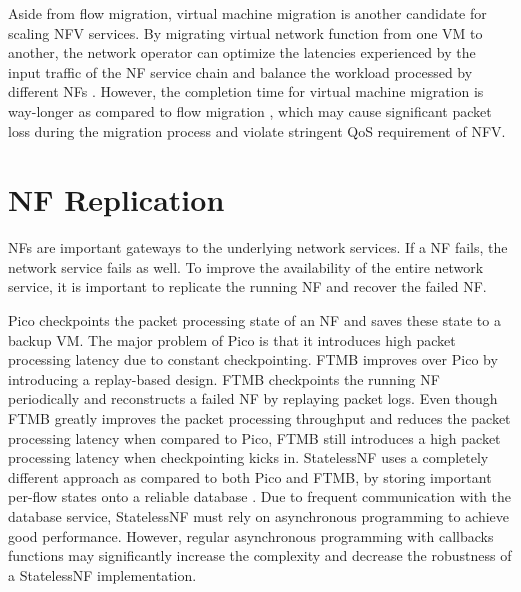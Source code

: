 Aside from flow migration, virtual machine migration is another candidate for scaling NFV services. By migrating virtual network function from one VM to another, the network operator can optimize the latencies experienced by the input traffic of the NF service chain \cite{cho2017real, carpio2017balancing} and balance the workload processed by different NFs \cite{carpio2017balancing}. However, the completion time for virtual machine migration is way-longer \cite{nelson2005fast} as compared to flow migration \cite{gember2015opennf}, which may cause significant packet loss during the migration process and violate stringent QoS requirement of NFV.

\section{NF Replication}

NFs are important gateways to the underlying network services. If a NF fails, the network service fails as well. To improve the availability of the entire network service, it is important to replicate the running NF and recover the failed NF.

Pico \cite{rajagopalan2013pico} checkpoints the packet processing state of an NF and saves these state to a backup VM. The major problem of Pico is that it introduces high packet processing latency due to constant checkpointing. FTMB \cite{sherry2015rollback} improves over Pico by introducing a replay-based design. FTMB checkpoints the running NF periodically and reconstructs a failed NF by replaying packet logs. Even though FTMB greatly improves the packet processing throughput and reduces the packet processing latency when compared to Pico, FTMB still introduces a high packet processing latency when checkpointing kicks in. StatelessNF \cite{201545} uses a completely different approach as compared to both Pico and FTMB, by storing important per-flow states onto a reliable database \cite{ongaro2011fast}. Due to frequent communication with the database service, StatelessNF must rely on asynchronous programming to achieve good performance. However, regular asynchronous programming with callbacks functions may significantly increase the complexity and decrease the robustness of a StatelessNF implementation.




